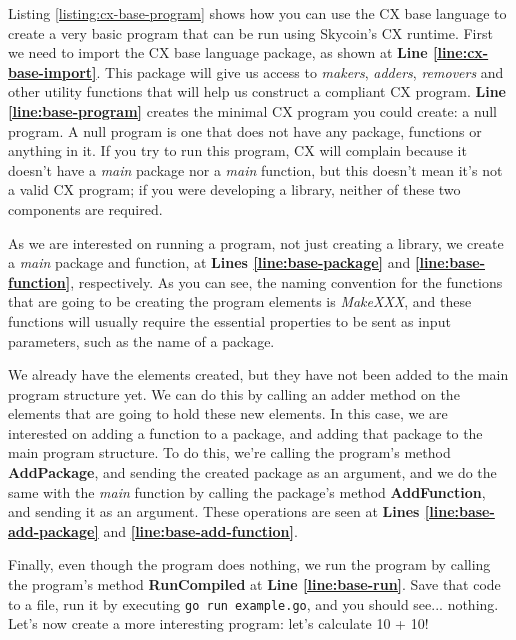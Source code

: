 \documentclass[11pt,fleqn,openany]{book} %
\begin{document}
Listing \ref{listing:cx-base-program} shows how you can use the CX base language to create a very basic program that can be run using Skycoin's CX runtime. First we need to import the CX base language package, as shown at \textbf{Line \ref{line:cx-base-import}}. This package will give us access to \emph{makers}, \emph{adders}, \emph{removers} and other utility functions that will help us construct a compliant CX program. \textbf{Line \ref{line:base-program}} creates the minimal CX program you could create: a null program. A null program is one that does not have any package, functions or anything in it. If you try to run this program, CX will complain because it doesn't have a \emph{main} package nor a \emph{main} function, but this doesn't mean it's not a valid CX program; if you were developing a library, neither of these two components are required.

As we are interested on running a program, not just creating a library, we create a \emph{main} package and function, at \textbf{Lines \ref{line:base-package}} and \textbf{\ref{line:base-function}}, respectively. As you can see, the naming convention for the functions that are going to be creating the program elements is \emph{MakeXXX}, and these functions will usually require the essential properties to be sent as input parameters, such as the name of a package.

We already have the elements created, but they have not been added to the main program structure yet. We can do this by calling an adder method on the elements that are going to hold these new elements. In this case, we are interested on adding a function to a package, and adding that package to the main program structure. To do this, we're calling the program's method \textbf{AddPackage}, and sending the created package as an argument, and we do the same with the \emph{main} function by calling the package's method \textbf{AddFunction}, and sending it as an argument. These operations are seen at \textbf{Lines \ref{line:base-add-package}} and \textbf{\ref{line:base-add-function}}.

Finally, even though the program does nothing, we run the program by calling the program's method \textbf{RunCompiled} at \textbf{Line \ref{line:base-run}}. Save that code to a file, run it by executing \lstinline{go run example.go}, and you should see... nothing. Let's now create a more interesting program: let's calculate 10 + 10!
\end{document}
